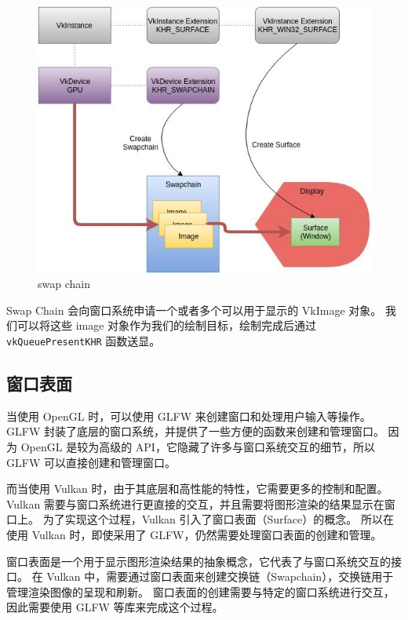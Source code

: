 \documentclass[a4paper, 12pt]{ctexart}
\begin{document}
    \begin{figure}[htbp]
        \centering
        \includegraphics[scale = 0.6]{images/swapchain.jpg}
        \caption{swap chain}
    \end{figure}
    
    Swap Chain 会向窗口系统申请一个或者多个可以用于显示的 VkImage 对象。
    我们可以将这些 image 对象作为我们的绘制目标，绘制完成后通过 \texttt{vkQueuePresentKHR} 函数送显。


\clearpage
\subsection{窗口表面}
    当使用 OpenGL 时，可以使用 GLFW 来创建窗口和处理用户输入等操作。
    GLFW 封装了底层的窗口系统，并提供了一些方便的函数来创建和管理窗口。
    因为 OpenGL 是较为高级的 API，它隐藏了许多与窗口系统交互的细节，所以 GLFW 可以直接创建和管理窗口。

    而当使用 Vulkan 时，由于其底层和高性能的特性，它需要更多的控制和配置。
    Vulkan 需要与窗口系统进行更直接的交互，并且需要将图形渲染的结果显示在窗口上。
    为了实现这个过程，Vulkan 引入了窗口表面（Surface）的概念。
    所以在使用 Vulkan 时，即使采用了 GLFW，仍然需要处理窗口表面的创建和管理。

    窗口表面是一个用于显示图形渲染结果的抽象概念，它代表了与窗口系统交互的接口。
    在 Vulkan 中，需要通过窗口表面来创建交换链（Swapchain），交换链用于管理渲染图像的呈现和刷新。
    窗口表面的创建需要与特定的窗口系统进行交互，因此需要使用 GLFW 等库来完成这个过程。
\end{document}
